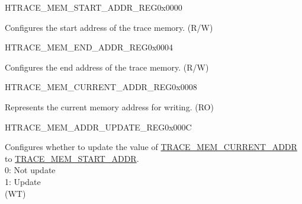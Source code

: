 \begin{register}{H}{TRACE\_MEM\_START\_ADDR\_REG}{0x0000}\label{regdesc:TRACEMEMSTARTADDRREG}
%
\regnewline%
\begin{regdesc}\begin{reglist}
\label{fielddesc:TRACEMEMSTARTADDR}\item [TRACE\_MEM\_START\_ADDR] Configures the start address of the trace memory. (R/W)
\end{reglist}\end{regdesc}
\end{register}

\begin{register}{H}{TRACE\_MEM\_END\_ADDR\_REG}{0x0004}\label{regdesc:TRACEMEMENDADDRREG}
%
\regnewline%
\begin{regdesc}\begin{reglist}
\label{fielddesc:TRACEMEMENDADDR}\item [TRACE\_MEM\_END\_ADDR] Configures the end address of the trace memory. (R/W)
\end{reglist}\end{regdesc}
\end{register}

\begin{register}{H}{TRACE\_MEM\_CURRENT\_ADDR\_REG}{0x0008}\label{regdesc:TRACEMEMCURRENTADDRREG}
%
\regnewline%
\begin{regdesc}\begin{reglist}
\label{fielddesc:TRACEMEMCURRENTADDR}\item [TRACE\_MEM\_CURRENT\_ADDR] Represents the current memory address for writing. (RO)
\end{reglist}\end{regdesc}
\end{register}

\begin{register}{H}{TRACE\_MEM\_ADDR\_UPDATE\_REG}{0x000C}\label{regdesc:TRACEMEMADDRUPDATEREG}
%
%
\regnewline%
\begin{regdesc}\begin{reglist}
\label{fielddesc:TRACEMEMCURRENTADDRUPDATE}\item [TRACE\_MEM\_CURRENT\_ADDR\_UPDATE] Configures whether to update the value of \hyperref[fielddesc:TRACEMEMCURRENTADDR]{TRACE\_MEM\_CURRENT\_ADDR} to \hyperref[fielddesc:TRACEMEMSTARTADDR]{TRACE\_MEM\_START\_ADDR}.\\0: Not update\\1: Update\\ (WT)
\end{reglist}\end{regdesc}
\end{register}

